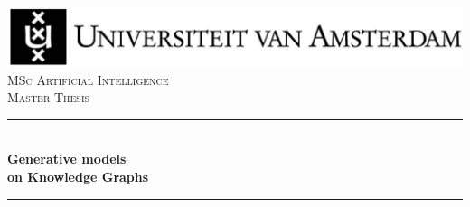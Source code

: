 \documentclass{article}
\begin{document}
\begin{titlepage}



\newcommand{\HRule}{\rule{\linewidth}{0.5mm}} %

\center %

 






\includegraphics[width=\linewidth]{data/images/uvaENG}\\[2.5cm]

\textsc{\Large MSc Artificial Intelligence}\\[0.2cm]

\textsc{\Large Master Thesis}\\[0.5cm] 








\HRule \\[0.4cm]

{ \huge \bfseries Generative models \\ on Knowledge Graphs \\[0.4cm] } %

\HRule \\[0.5cm]

 







\end{titlepage}
\end{document}
